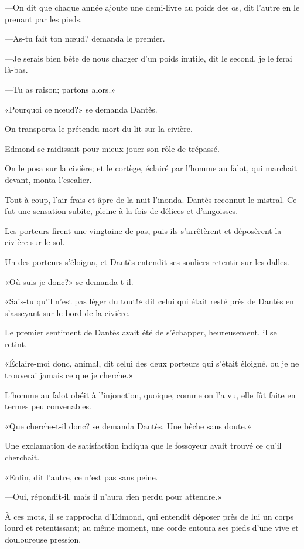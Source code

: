 —On dit que chaque année ajoute une demi-livre au poids des os, dit l'autre en le prenant par les pieds.

—As-tu fait ton nœud? demanda le premier.

—Je serais bien bête de nous charger d'un poids inutile, dit le second, je le ferai là-bas.

—Tu as raison; partons alors.»

«Pourquoi ce nœud?» se demanda Dantès.

On transporta le prétendu mort du lit sur la civière.

Edmond se raidissait pour mieux jouer son rôle de trépassé.

On le posa sur la civière; et le cortège, éclairé par l'homme au falot, qui marchait devant, monta l'escalier.

Tout à coup, l'air frais et âpre de la nuit l'inonda. Dantès reconnut le mistral. Ce fut une sensation subite, pleine à la fois de délices et d'angoisses.

Les porteurs firent une vingtaine de pas, puis ils s'arrêtèrent et déposèrent la civière sur le sol.

Un des porteurs s'éloigna, et Dantès entendit ses souliers retentir sur les dalles.

«Où suis-je donc?» se demanda-t-il.

«Sais-tu qu'il n'est pas léger du tout!» dit celui qui était resté près de Dantès en s'asseyant sur le bord de la civière.

Le premier sentiment de Dantès avait été de s'échapper, heureusement, il se retint.

«Éclaire-moi donc, animal, dit celui des deux porteurs qui s'était éloigné, ou je ne trouverai jamais ce que je cherche.»

L'homme au falot obéit à l'injonction, quoique, comme on l'a vu, elle fût faite en termes peu convenables.

«Que cherche-t-il donc? se demanda Dantès. Une bêche sans doute.»

Une exclamation de satisfaction indiqua que le fossoyeur avait trouvé ce qu'il cherchait.

«Enfin, dit l'autre, ce n'est pas sans peine.

—Oui, répondit-il, mais il n'aura rien perdu pour attendre.»

À ces mots, il se rapprocha d'Edmond, qui entendit déposer près de lui un corps lourd et retentissant; au même moment, une corde entoura ses pieds d'une vive et douloureuse pression.

